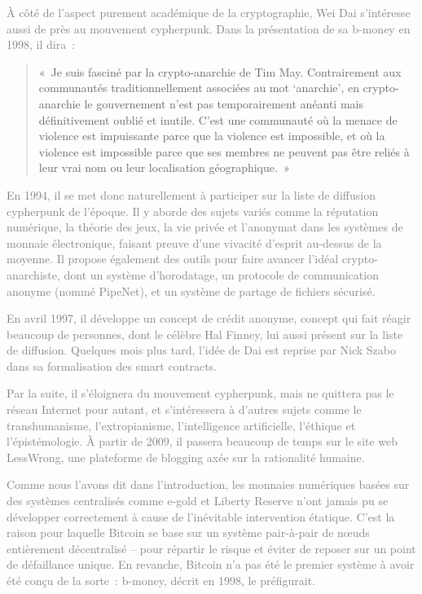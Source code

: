 \textcolor{gray}{À côté de l'aspect purement académique de la cryptographie, Wei Dai s'intéresse aussi de près au mouvement cypherpunk. Dans la présentation de sa b-money en 1998, il dira~:}

\begin{quote}
«~Je suis fasciné par la crypto-anarchie de Tim May. Contrairement aux communautés traditionnellement associées au mot ‘anarchie', en crypto-anarchie le gouvernement n'est pas temporairement anéanti mais définitivement oublié et inutile. C'est une communauté où la menace de violence est impuissante parce que la violence est impossible, et où la violence est impossible parce que ses membres ne peuvent pas être reliés à leur vrai nom ou leur localisation géographique.~»
\end{quote}

\textcolor{gray}{En 1994, il se met donc naturellement à participer sur la liste de diffusion cypherpunk de l'époque. Il y aborde des sujets variés comme la réputation numérique, la théorie des jeux, la vie privée et l'anonymat dans les systèmes de monnaie électronique, faisant preuve d'une vivacité d'esprit au-dessus de la moyenne. Il propose également des outils pour faire avancer l'idéal crypto-anarchiste, dont un système d'horodatage, un protocole de communication anonyme (nommé PipeNet), et un système de partage de fichiers sécurisé.}

\textcolor{gray}{En avril 1997, il développe un concept de crédit anonyme, concept qui fait réagir beaucoup de personnes, dont le célèbre Hal Finney, lui aussi présent sur la liste de diffusion. Quelques mois plus tard, l'idée de Dai est reprise par Nick Szabo dans sa formalisation des smart contracts.}

\textcolor{gray}{Par la suite, il s'éloignera du mouvement cypherpunk, mais ne quittera pas le réseau Internet pour autant, et s'intéressera à d'autres sujets comme le transhumanisme, l'extropianisme, l'intelligence artificielle, l'éthique et l'épistémologie. À partir de 2009, il passera beaucoup de temps sur le site web LessWrong, une plateforme de blogging axée sur la rationalité humaine.}

\textcolor{gray}{Comme nous l'avons dit dans l'introduction, les monnaies numériques basées sur des systèmes centralisés comme e-gold et Liberty Reserve n'ont jamais pu se développer correctement à cause de l'inévitable intervention étatique. C'est la raison pour laquelle Bitcoin se base sur un système pair-à-pair de nœuds entièrement décentralisé – pour répartir le risque et éviter de reposer sur un point de défaillance unique. En revanche, Bitcoin n'a pas été le premier système à avoir été conçu de la sorte~: b-money, décrit en 1998, le préfigurait.}

